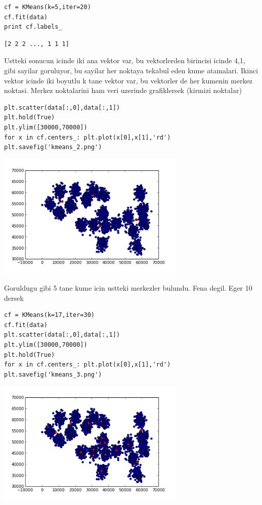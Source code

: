 \documentclass[12pt,fleqn]{article}\usepackage{../common}
\begin{document}
\begin{verbatim}
cf = KMeans(k=5,iter=20)
cf.fit(data)
print cf.labels_
\end{verbatim}

\begin{verbatim}
[2 2 2 ..., 1 1 1]
\end{verbatim}

Ustteki sonucun icinde iki ana vektor var, bu vektorlerden birincisi
icinde 4,1, gibi sayilar goruluyor, bu sayilar her noktaya tekabul
eden kume atamalari.  Ikinci vektor icinde iki boyutlu k tane vektor
var, bu vektorler de her kumenin merkez noktasi. Merkez noktalarini ham
veri uzerinde grafiklersek (kirmizi noktalar)

\begin{verbatim}
plt.scatter(data[:,0],data[:,1])
plt.hold(True)
plt.ylim([30000,70000])
for x in cf.centers_: plt.plot(x[0],x[1],'rd')
plt.savefig('kmeans_2.png')
\end{verbatim}

\includegraphics[height=6cm]{kmeans_2.png}

Goruldugu gibi 5 tane kume icin ustteki merkezler bulundu. Fena
degil. Eger 10 dersek

\begin{verbatim}
cf = KMeans(k=17,iter=30)
cf.fit(data)
plt.scatter(data[:,0],data[:,1])
plt.ylim([30000,70000])
plt.hold(True)
for x in cf.centers_: plt.plot(x[0],x[1],'rd')
plt.savefig('kmeans_3.png')
\end{verbatim}

\includegraphics[height=6cm]{kmeans_3.png}
\end{document}
